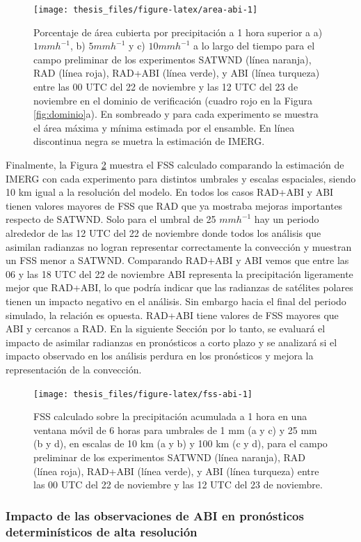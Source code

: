 \documentclass[12pt,oneside,a4paper]{reedthesis}
\begin{document}
\begin{figure}
\texttt{[image: thesis\_files/figure-latex/area-abi-1]} \caption{Porcentaje de área cubierta por precipitación a 1 hora superior a a) \(1 mmh^{-1}\), b) \(5 mmh^{-1}\) y c) \(10 mmh^{-1}\) a lo largo del tiempo para el campo preliminar de los experimentos SATWND (línea naranja), RAD (línea roja), RAD+ABI (línea verde), y ABI (línea turqueza) entre las 00 UTC del 22 de noviembre y las 12 UTC del 23 de noviembre en el dominio de verificación (cuadro rojo en la Figura \ref{fig:dominio}a). En sombreado y para cada experimento se muestra el área máxima y mínima estimada por el ensamble. En línea discontinua negra se muetra la estimación de IMERG.}\label{fig:area-abi}
\end{figure}
Finalmente, la Figura \ref{fig:fss-abi} muestra el FSS calculado comparando la estimación de IMERG con cada experimento para distintos umbrales y escalas espaciales, siendo 10 km igual a la resolución del modelo. En todos los casos RAD+ABI y ABI tienen valores mayores de FSS que RAD que ya mostraba mejoras importantes respecto de SATWND. Solo para el umbral de 25 \(mmh^{-1}\) hay un periodo alrededor de las 12 UTC del 22 de noviembre donde todos los análisis que asimilan radianzas no logran representar correctamente la convección y muestran un FSS menor a SATWND. Comparando RAD+ABI y ABI vemos que entre las 06 y las 18 UTC del 22 de noviembre ABI representa la precipitación ligeramente mejor que RAD+ABI, lo que podría indicar que las radianzas de satélites polares tienen un impacto negativo en el análisis. Sin embargo hacia el final del periodo simulado, la relación es opuesta. RAD+ABI tiene valores de FSS mayores que ABI y cercanos a RAD. En la siguiente Sección por lo tanto, se evaluará el impacto de asimilar radianzas en pronósticos a corto plazo y se analizará si el impacto observado en los análisis perdura en los pronósticos y mejora la representación de la convección.


\begin{figure}
\texttt{[image: thesis\_files/figure-latex/fss-abi-1]} \caption{FSS calculado sobre la precipitación acumulada a 1 hora en una ventana móvil de 6 horas para umbrales de 1 mm (a y c) y 25 mm (b y d), en escalas de 10 km (a y b) y 100 km (c y d), para el campo preliminar de los experimentos SATWND (línea naranja), RAD (línea roja), RAD+ABI (línea verde), y ABI (línea turqueza) entre las 00 UTC del 22 de noviembre y las 12 UTC del 23 de noviembre.}\label{fig:fss-abi}
\end{figure}
\hypertarget{impacto-de-las-observaciones-de-abi-en-pronuxf3sticos-determinuxedsticos-de-alta-resoluciuxf3n}{%
\subsubsection{Impacto de las observaciones de ABI en pronósticos determinísticos de alta resolución}\label{impacto-de-las-observaciones-de-abi-en-pronuxf3sticos-determinuxedsticos-de-alta-resoluciuxf3n}}
\end{document}
